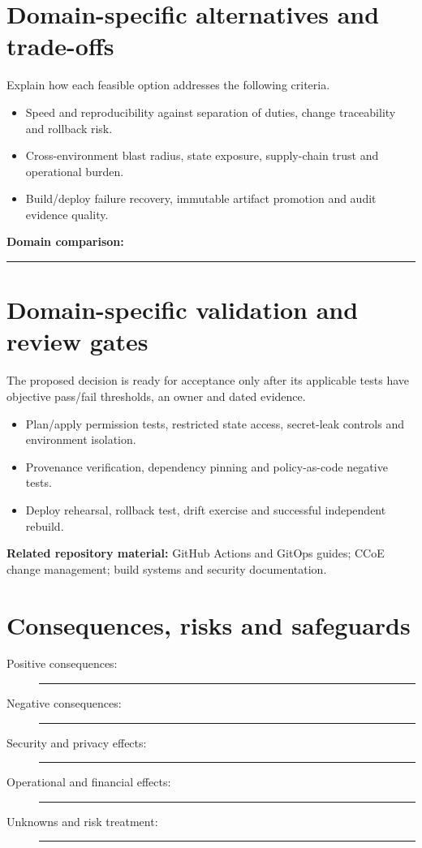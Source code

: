 \documentclass[11pt,letterpaper]{article}
\newcommand{\BlankResponse}{\rule[-0.4em]{0pt}{2em}\rule{0.65\linewidth}{0.4pt}}
\begin{document}
\section{Domain-specific alternatives and trade-offs}
Explain how each feasible option addresses the following criteria.
\begin{itemize}
\item Speed and reproducibility against separation of duties, change traceability and rollback risk.
\item Cross-environment blast radius, state exposure, supply-chain trust and operational burden.
\item Build/deploy failure recovery, immutable artifact promotion and audit evidence quality.
\end{itemize}
\noindent\textbf{Domain comparison:} \BlankResponse
\section{Domain-specific validation and review gates}
The proposed decision is ready for acceptance only after its applicable
tests have objective pass/fail thresholds, an owner and dated evidence.
\begin{itemize}
\item Plan/apply permission tests, restricted state access, secret-leak controls and environment isolation.
\item Provenance verification, dependency pinning and policy-as-code negative tests.
\item Deploy rehearsal, rollback test, drift exercise and successful independent rebuild.
\end{itemize}
\noindent\textbf{Related repository material:} GitHub Actions and GitOps guides; CCoE change management; build systems and security documentation.

\section{Consequences, risks and safeguards}
\begin{description}
\item[Positive consequences:] \BlankResponse
\item[Negative consequences:] \BlankResponse
\item[Security and privacy effects:] \BlankResponse
\item[Operational and financial effects:] \BlankResponse
\item[Unknowns and risk treatment:] \BlankResponse
\end{description}
\end{document}
